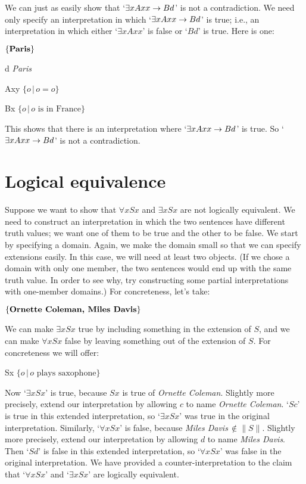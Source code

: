 We can just as easily show that `$\exists xAxx \eif Bd$' is not a contradiction. We need only specify an interpretation in which `$\exists xAxx \eif Bd$' is true; i.e., an interpretation in which either `$\exists x Axx$' is false or `$Bd$' is true. Here is one:
	\begin{ekey}
		\item[\text{domain}] $\{\emph{Paris}\}$
		\item[d] \emph{Paris}
		\item[Axy] $\{o\,|\,o=o\}$
		\item[Bx] $\{o\,|\,\text{$o$ is in France}\}$
	\end{ekey}
This shows that there is an interpretation where `$\exists xAxx \eif Bd$' is true. So `$\exists x Axx \eif Bd$' is not a contradiction.

\section{Logical equivalence}
Suppose we want to show that $\forall x Sx$ and $\exists x Sx$ are not logically equivalent. We need to construct an interpretation in which the two sentences have different truth values; we want one of them to be true and the other to be false. We start by specifying a domain. Again, we make the domain small so that we can specify extensions easily. In this case, we will need at least two objects. (If we chose a domain with only one member, the two sentences would end up with the same truth value. In order to see why, try constructing some partial interpretations with one-member domains.) For concreteness, let's take:
	\begin{ekey}
		\item[\text{domain}] $\{\text{\emph{Ornette Coleman, Miles Davis}}\}$
	\end{ekey}
We can make $\exists x Sx$ true by including something in the extension of $S$, and we can make $\forall x Sx$ false by leaving something out of the extension of $S$. For concreteness we will offer:
	\begin{ekey}
		\item[Sx] $\{o\,|\,\text{$o$ plays saxophone}\}$
	\end{ekey}
Now `$\exists x Sx$' is true, because $Sx$ is true of \emph{Ornette Coleman}. Slightly more precisely, extend our interpretation by allowing $c$ to name \emph{Ornette Coleman}.  `$Sc$' is true in this extended interpretation, so `$\exists x Sx$' was true in the original interpretation. Similarly, `$\forall x Sx$' is false, because \emph{Miles Davis}$\,\not\in\|S\|$. Slightly more precisely, extend our interpretation by allowing $d$ to name \emph{Miles Davis}. Then `$Sd$' is false in this extended interpretation, so `$\forall x Sx$' was false in the original interpretation. We have provided a counter-interpretation to the claim that `$\forall x Sx$' and `$\exists x Sx$' are logically equivalent.
